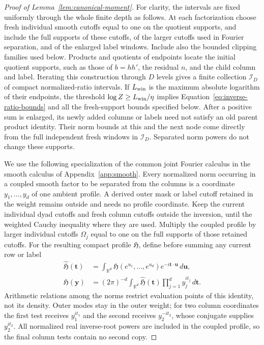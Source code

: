 \documentclass[12pt]{article}
\begin{document}
\begin{proof}[Proof of Lemma~\ref{lem:canonical-moment}]
For clarity, the intervals are fixed uniformly through the whole finite
depth as follows.  At each factorization choose fresh individual smooth
cutoffs equal to one on the quotient supports, and include the full
supports of these cutoffs, of the larger cutoffs used in Fourier
separation, and of the enlarged label windows.  Include also the bounded
clipping families used below.  Products and quotients of endpoints locate
the initial quotient supports, such as those of \(b=hh'\), the residual
\(n\), and the child column and label.  Iterating this construction
through \(D\) levels gives a finite collection \(\mathcal I_D\) of compact
normalized-ratio intervals.  If \(L_{\rm win}\) is the maximum absolute
logarithm of their endpoints, the threshold
\(\log Z\ge L_{\rm win}/\eta\) implies
Equation~\eqref{eq:inverse-ratio-bounds} and all the fresh-support bounds
specified below.  After a positive sum is enlarged, its newly added
columns or labels need not satisfy an old parent product identity.  Their
norm bounds at this and the next node come directly from the full
independent fresh windows in \(\mathcal I_D\).  Separated norm powers do
not change these supports.

We use the following specialization of the common joint Fourier calculus in
the smooth calculus of Appendix~\ref{app:smooth}.
Every normalized norm occurring in a coupled smooth factor to be separated
from the columns is a coordinate \(y_1,\ldots,y_d\) of one ambient profile.
A derived outer mask or label cutoff retained in the weight remains
outside and needs no profile coordinate.  Keep the current
individual dyad cutoffs and fresh column cutoffs outside the inversion,
until the weighted Cauchy inequality where they are used.  Multiply the
coupled profile by larger individual cutoffs \(\Omega_j\) equal to one
on the full supports of those retained cutoffs.  For the resulting
compact profile \(\mathfrak H\), define before summing any current row or
label
\begin{equation}\label{eq:inverse-log-fourier}
 \begin{split}
 \widehat{\mathfrak H}(\boldsymbol t)
   &=\int_{\mathbb R^d}\mathfrak H(e^{u_1},\ldots,e^{u_d})
             e^{-i\boldsymbol t\cdot\boldsymbol u}\,d\boldsymbol u,\\
 \mathfrak H(\boldsymbol y)
   &=(2\pi)^{-d}\int_{\mathbb R^d}\widehat{\mathfrak H}(\boldsymbol t)
          \prod_{j=1}^dy_j^{it_j}\,d\boldsymbol t.
 \end{split}
\end{equation}
Arithmetic relations among the norms restrict evaluation points of this
identity, not its density.  Outer modes stay in the outer weight; for
two column coordinates the first test receives \(y_1^{it_1}\) and the
second receives \(y_2^{-it_2}\), whose conjugate supplies
\(y_2^{it_2}\).  All normalized real inverse-root powers are included
in the coupled profile, so the final column tests contain no second copy.


\end{proof}
\end{document}

